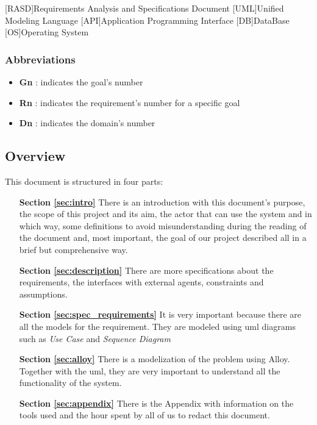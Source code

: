 \begin{acronym}[RASD] %

[RASD]{Requirements Analysis and Specifications Document}
[UML]{Unified Modeling Language}
[API]{Application Programming Interface}
[DB]{DataBase}
[OS]{Operating System}

\end{acronym}

\subsubsection{Abbreviations} \label{abbre}
\begin{itemize}
\item \textbf{Gn} : indicates the goal's number
\item \textbf{Rn} : indicates the requirement's number for a specific goal
\item \textbf{Dn} : indicates the domain's number
\end{itemize}


\subsection{Overview} \label{subsec:overview}
This document is structured in four parts:
\begin{itemize}
\item[\textbf{Section \ref{sec:intro}}]There is an introduction with this document's purpose, the scope of this project and its aim, the actor that can use the system and in which way, some definitions to avoid misunderstanding during the reading of the document and, most important, the goal of our project described all in a brief but comprehensive way.  
\item[\textbf{Section \ref{sec:description}}]There are more specifications about the requirements, the interfaces with external agents, constraints and assumptions.
\item[\textbf{Section \ref{sec:spec_requirements}}]It is very important because there are all the models for the requirement. They are modeled using \acs{uml} diagrams such as \emph{Use Case} and \emph{Sequence Diagram}
\item[\textbf{Section \ref{sec:alloy}}]There is a modelization of the problem using Alloy. Together with the \acs{uml}, they are very important to understand all the functionality of the system.  
\item[\textbf{Section \ref{sec:appendix}}]There is the Appendix with information on the tools used and the hour spent by all of us to redact this document.
\end{itemize}

